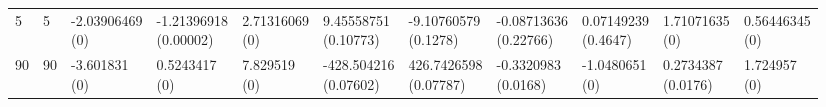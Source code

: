 \documentclass[12pt,a4paper,twoside,openany]{book}
\begin{document}
\begin{table}[ht]
{\begin{tabular}{lllllllllll}
  5 & 5 & \makecell{-2.03906469 \\ (0)} & \makecell{-1.21396918 \\ (0.00002)} & \makecell{2.71316069 \\ (0)} & \makecell{9.45558751 \\ (0.10773)} & \makecell{-9.10760579 \\ (0.1278)} & \makecell{-0.08713636 \\ (0.22766)} & \makecell{0.07149239 \\ (0.4647)} & \makecell{1.71071635 \\ (0)} & \makecell{0.56446345 \\ (0)} \\ 
  90 & 90 & \makecell{-3.601831 \\ (0)} & \makecell{0.5243417 \\ (0)} & \makecell{7.829519 \\ (0)} & \makecell{-428.504216 \\ (0.07602)} & \makecell{426.7426598 \\ (0.07787)} & \makecell{-0.3320983 \\ (0.0168)} & \makecell{-1.0480651 \\ (0)} & \makecell{0.2734387 \\ (0.0176)} & \makecell{1.724957 \\ (0)} \\ 
   \hline
\end{tabular}}
\end{table}
\end{document}
